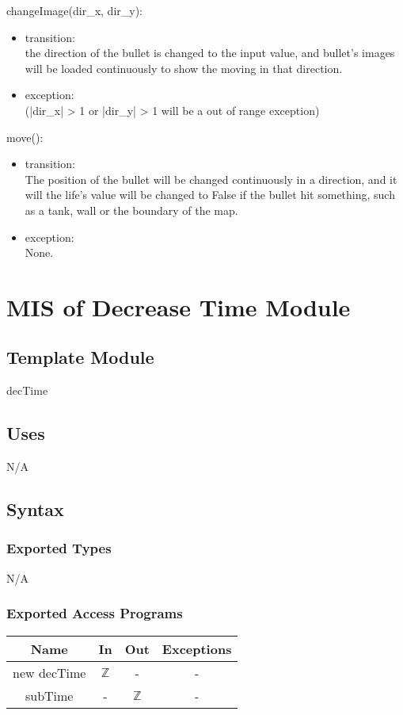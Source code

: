 \documentclass[12pt, titlepage]{article}
\begin{document}
	    changeImage(dir\_x, dir\_y):
	    \begin{itemize}
	    \item transition:\\ the direction of the bullet is changed to the input value, and bullet's images will be loaded continuously to show the moving in that direction.
	    \item exception:\\(|dir\_x| > 1 or |dir\_y| > 1 will be a out of range exception)
	    \end{itemize}
	    move():
	    \begin{itemize}
	    \item transition:\\ The position of the bullet will be changed continuously in a direction, and it will the life's value will be changed to False if the bullet hit something, such as a tank, wall or the boundary of the map.
	   \item exception: \\None.
	    \end{itemize}
		
\section{MIS of Decrease Time Module}
        \subsection{Template Module}
        decTime
        \subsection{Uses}
        N/A
		\subsection{Syntax}
		\subsubsection{Exported Types}
		N/A
		\subsubsection{Exported Access Programs}
		\begin{tabular}[pos]{|c|c|c|c|}
			
			\hline
			\textbf{Name}& \textbf{In} & \textbf{Out} & \textbf{Exceptions} \\ \hline
			new decTime & $\mathbb{Z}$ & - & -\\ \hline
			subTime & - & $\mathbb{Z}$ & -\\ \hline

			
		\end{tabular}
		
\end{document}
